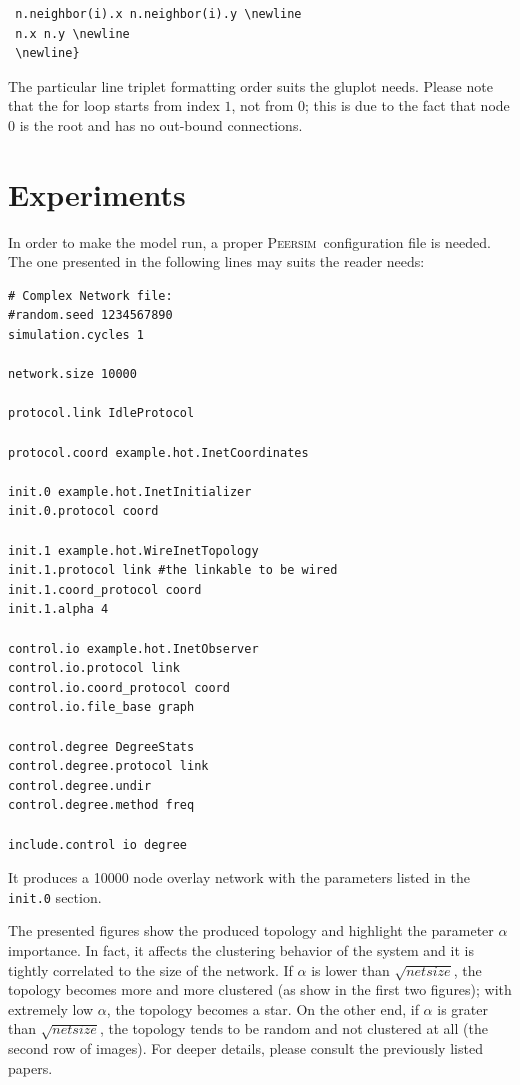 \documentclass[a4paper,11pt]{article}
\newcommand{\id}[1]{{\scshape\small #1}}
\newcommand{\psim}{\id{Peersim}}
\begin{document}
\footnotesize
\begin{verbatim}
 n.neighbor(i).x n.neighbor(i).y \newline
 n.x n.y \newline
 \newline}
\end{verbatim}
\normalsize 

The particular line triplet formatting order suits the gluplot needs. 
Please note that the for loop starts from index $1$, not from $0$;
this is due to the fact that node 0 is the root and has no out-bound
connections.

\section{Experiments}
\label{s:experiments}

In order to make the model run, a proper \psim~configuration file is 
needed. The one presented in the following lines may suits the reader needs:

\footnotesize
\begin{verbatim}
# Complex Network file:
#random.seed 1234567890
simulation.cycles 1

network.size 10000

protocol.link IdleProtocol

protocol.coord example.hot.InetCoordinates

init.0 example.hot.InetInitializer
init.0.protocol coord

init.1 example.hot.WireInetTopology
init.1.protocol link #the linkable to be wired
init.1.coord_protocol coord
init.1.alpha 4

control.io example.hot.InetObserver
control.io.protocol link
control.io.coord_protocol coord
control.io.file_base graph

control.degree DegreeStats
control.degree.protocol link
control.degree.undir
control.degree.method freq

include.control io degree
\end{verbatim}
\normalsize

It produces a 10000 node overlay network with the parameters listed in 
the \texttt{init.0} section.

The presented figures show the produced topology and highlight the 
parameter $\alpha$ importance. In fact, it affects the clustering behavior of 
the system and it is tightly correlated to the size of the network. If 
$\alpha$ is lower than $\sqrt{netsize}$, the topology becomes more and more 
clustered (as show in the first two figures); with extremely low $\alpha$, 
the topology becomes a star. On the other end, if $\alpha$ is grater than 
$\sqrt{netsize}$, the topology tends to be random and not clustered at all 
(the second row of images). For deeper details, please consult the previously
listed papers.
\end{document}
